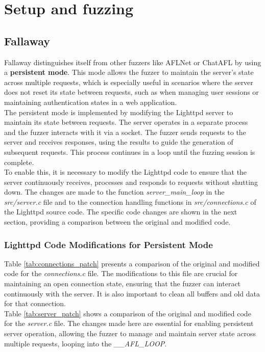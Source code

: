 \chapter{Setup and fuzzing}

\section{Fallaway}
Fallaway distinguishes itself from other fuzzers like AFLNet or ChatAFL by using a \textbf{persistent mode}. This mode allows the fuzzer to maintain the server's state across multiple requests, which is especially useful in scenarios where the server does not reset its state between requests, such as when managing user sessions or maintaining authentication states in a web application.
\\The persistent mode is implemented by modifying the Lighttpd server to maintain its state between requests. The server operates in a separate process and the fuzzer interacts with it via a socket. The fuzzer sends requests to the server and receives responses, using the results to guide the generation of subsequent requests. This process continues in a loop until the fuzzing session is complete.
\\To enable this, it is necessary to modify the Lighttpd code to ensure that the server continuously receives, processes and responds to requests without shutting down. The changes are made to the function \textit{server\_main\_loop} in the \textit{src/server.c} file and to the connection handling functions in \textit{src/connections.c} of the Lighttpd source code. The specific code changes are shown in the next section, providing a comparison between the original and modified code.

\subsection{Lighttpd Code Modifications for Persistent Mode}

Table \ref{tab:connections_patch} presents a comparison of the original and modified code for the \textit{connections.c} file. The modifications to this file are crucial for maintaining an open connection state, ensuring that the fuzzer can interact continuously with the server. It is also important to clean all buffers and old data for that connection.
\\Table \ref{tab:server_patch} shows a comparison of the original and modified code for the \textit{server.c} file. The changes made here are essential for enabling persistent server operation, allowing the fuzzer to manage and maintain server state across multiple requests, looping into the \textit{\_\_AFL\_LOOP}.

